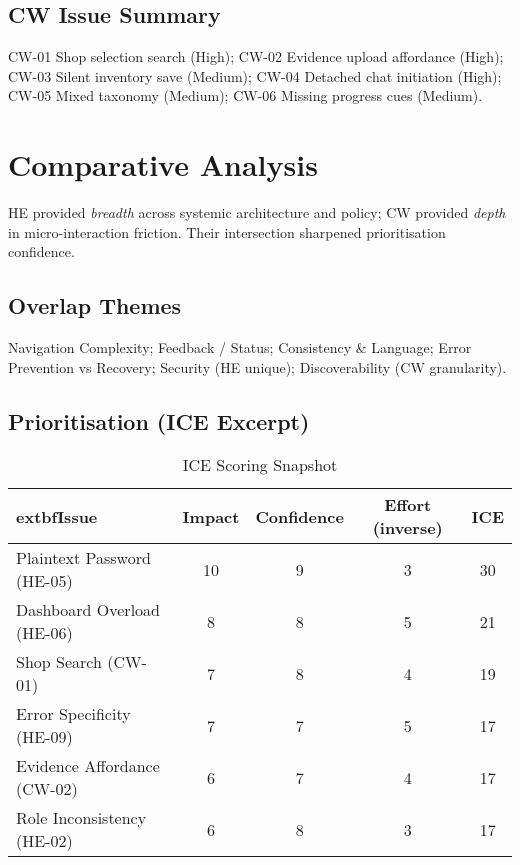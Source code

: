 \documentclass[11pt,a4paper]{article}
\begin{document}
\subsection{CW Issue Summary}
CW-01 Shop selection search (High); CW-02 Evidence upload affordance (High); CW-03 Silent inventory save (Medium); CW-04 Detached chat initiation (High); CW-05 Mixed taxonomy (Medium); CW-06 Missing progress cues (Medium).

\section{Comparative Analysis}
HE provided \emph{breadth} across systemic architecture and policy; CW provided \emph{depth} in micro-interaction friction. Their intersection sharpened prioritisation confidence.

\subsection{Overlap Themes}
Navigation Complexity; Feedback / Status; Consistency \& Language; Error Prevention vs Recovery; Security (HE unique); Discoverability (CW granularity).

\subsection{Prioritisation (ICE Excerpt)}
\begin{table}[h]
	\centering
	\caption{ICE Scoring Snapshot}\label{tab:ice}
	\begin{tabular}{|l|c|c|c|c|}
		\hline
			extbf{Issue} & \textbf{Impact} & \textbf{Confidence} & \textbf{Effort (inverse)} & \textbf{ICE} \\
		\hline
		Plaintext Password (HE-05) & 10 & 9 & 3 & 30 \\
		\hline
		Dashboard Overload (HE-06) & 8 & 8 & 5 & 21 \\
		\hline
		Shop Search (CW-01) & 7 & 8 & 4 & 19 \\
		\hline
		Error Specificity (HE-09) & 7 & 7 & 5 & 17 \\
		\hline
		Evidence Affordance (CW-02) & 6 & 7 & 4 & 17 \\
		\hline
		Role Inconsistency (HE-02) & 6 & 8 & 3 & 17 \\
		\hline
	\end{tabular}
\end{table}

\end{document}
